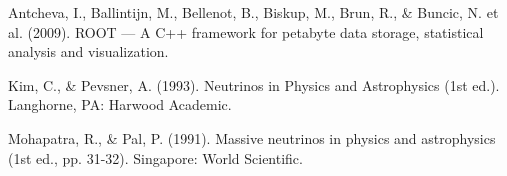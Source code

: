\documentclass[11pt, oneside]{book}
\begin{document}
\begin{thebibliography}{10}
 Antcheva, I., Ballintijn, M., Bellenot, B., Biskup, M., Brun, R., \& Buncic, N. et al. (2009). ROOT — A C++ framework for petabyte data storage, statistical analysis and visualization.

 Kim, C., \& Pevsner, A. (1993). Neutrinos in Physics and Astrophysics (1st ed.). Langhorne, PA: Harwood Academic.

 Mohapatra, R., \& Pal, P. (1991). Massive neutrinos in physics and astrophysics (1st ed., pp. 31-32). Singapore: World Scientific.

\end{thebibliography}
\end{document}
